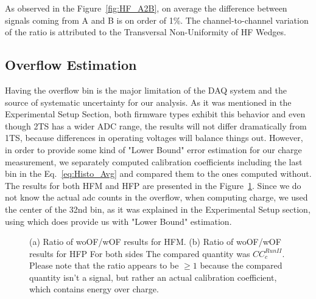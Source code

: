 As observed in the Figure~\ref{fig:HF_A2B}, on average the difference between
signals coming from A and B is on order of 1\%. The channel-to-channel variation
of the ratio is attributed to the Transversal Non-Uniformity of HF Wedges.

\subsection{Overflow Estimation}
Having the overflow bin is the major limitation of the DAQ system and the source of
systematic uncertainty for our analysis. As it was mentioned in the Experimental
Setup Section, both firmware types exhibit this behavior and even though 2TS
has a wider ADC range, the results will not differ dramatically from 1TS, because
differences in operating voltages will balance things out. However, in order to
provide some kind of "Lower Bound" error estimation for our charge measurement,
we separately computed calibration coefficients including the last bin in the
Eq.~\ref{eq:Histo_Avg} and compared them to the ones computed without. The results
for both HFM and HFP are presented in the Figure~\ref{fig:HF_Overflow}. Since we
do not know the actual adc counts in the overflow, when computing charge, we used
the center of the 32nd bin, as it was explained in the Experimental Setup section,
using which does provide us with "Lower Bound" estimation.

\begin{figure}[htb]
    \begin{center}
        \caption
        {(a) Ratio of woOF/wOF results for HFM.
         (b) Ratio of woOF/wOF results for HFP
         For both sides The compared quantity was ${CC}^{Run II}_{c}$.
         Please note that the ratio appears to be $\geq1$ because the compared
         quantity isn't a signal, but rather an actual calibration coefficient,
         which contains energy over charge.}
        \label{fig:HF_Overflow}
    \end{center}
\end{figure}

